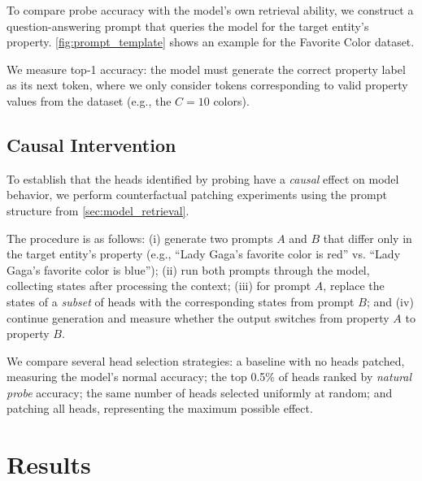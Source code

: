 \documentclass[11pt]{article}
\begin{document}
To compare probe accuracy with the model's own retrieval ability, we construct a question-answering prompt that queries the model for the target entity's property. \cref{fig:prompt_template} shows an example for the Favorite Color dataset.



We measure top-1 accuracy: the model must generate the correct property label as its next token, where we only consider tokens corresponding to valid property values from the dataset (e.g., the $C=10$ colors).

\subsection{Causal Intervention}
\label{sec:causal}

To establish that the heads identified by probing have a \emph{causal} effect on model behavior, we perform counterfactual patching experiments \cite{zhang2023patching} using the prompt structure from \cref{sec:model_retrieval}.

The procedure is as follows: (i) generate two prompts $A$ and $B$ that differ only in the target entity's property (e.g., ``Lady Gaga's favorite color is red'' vs. ``Lady Gaga's favorite color is blue''); (ii) run both prompts through the model, collecting states after processing the context; (iii) for prompt $A$, replace the states of a \emph{subset} of heads with the corresponding states from prompt $B$; and (iv) continue generation and measure whether the output switches from property $A$ to property $B$.

We compare several head selection strategies: a baseline with no heads patched, measuring the model's normal accuracy; the top 0.5\% of heads ranked by \textit{natural probe} accuracy; the same number of heads selected uniformly at random; and patching all heads, representing the maximum possible effect.

\section{Results}
\label{sec:results}
\end{document}
